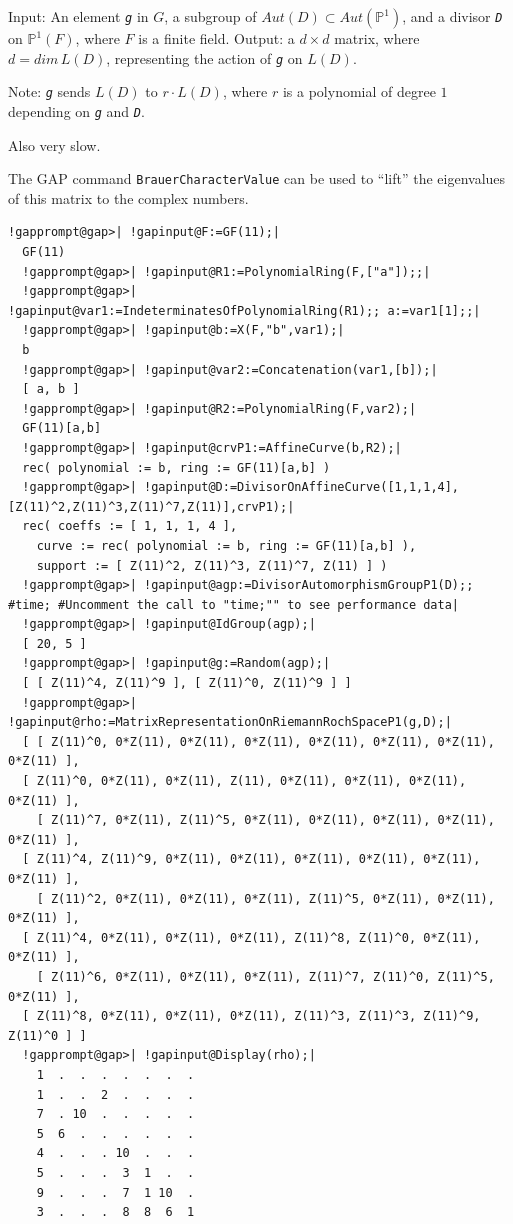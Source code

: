 \documentclass[a4paper,11pt]{report}
\begin{document}
{{{ Input: An element \mbox{\texttt{\mdseries\slshape g}} in $G$, a subgroup of $Aut(D)\subset Aut(\mathbb{P}^1)$, and a divisor \mbox{\texttt{\mdseries\slshape D}} on $\mathbb{P}^1(F)$, where $F$ is a finite field. Output: a $d\times d$ matrix, where $d = dim\, L(D)$, representing the action of \mbox{\texttt{\mdseries\slshape g}} on $L(D)$. 

 Note: \mbox{\texttt{\mdseries\slshape g}} sends $L(D)$ to $r\cdot L(D)$, where $r$ is a polynomial of degree $1$ depending on \mbox{\texttt{\mdseries\slshape g}} and \mbox{\texttt{\mdseries\slshape D}}. 

 Also very slow. 

 The GAP command \texttt{BrauerCharacterValue} can be used to ``lift'' the eigenvalues of this matrix to the complex numbers. 

 
\begin{Verbatim}[commandchars=!@|,fontsize=\small,frame=single,label=Example]
  !gapprompt@gap>| !gapinput@F:=GF(11);|
  GF(11)
  !gapprompt@gap>| !gapinput@R1:=PolynomialRing(F,["a"]);;|
  !gapprompt@gap>| !gapinput@var1:=IndeterminatesOfPolynomialRing(R1);; a:=var1[1];;|
  !gapprompt@gap>| !gapinput@b:=X(F,"b",var1);|
  b
  !gapprompt@gap>| !gapinput@var2:=Concatenation(var1,[b]);|
  [ a, b ]
  !gapprompt@gap>| !gapinput@R2:=PolynomialRing(F,var2);|
  GF(11)[a,b]
  !gapprompt@gap>| !gapinput@crvP1:=AffineCurve(b,R2);|
  rec( polynomial := b, ring := GF(11)[a,b] )
  !gapprompt@gap>| !gapinput@D:=DivisorOnAffineCurve([1,1,1,4],[Z(11)^2,Z(11)^3,Z(11)^7,Z(11)],crvP1);|
  rec( coeffs := [ 1, 1, 1, 4 ], 
    curve := rec( polynomial := b, ring := GF(11)[a,b] ), 
    support := [ Z(11)^2, Z(11)^3, Z(11)^7, Z(11) ] )
  !gapprompt@gap>| !gapinput@agp:=DivisorAutomorphismGroupP1(D);; #time; #Uncomment the call to "time;"" to see performance data|
  !gapprompt@gap>| !gapinput@IdGroup(agp);|
  [ 20, 5 ]
  !gapprompt@gap>| !gapinput@g:=Random(agp);|
  [ [ Z(11)^4, Z(11)^9 ], [ Z(11)^0, Z(11)^9 ] ]
  !gapprompt@gap>| !gapinput@rho:=MatrixRepresentationOnRiemannRochSpaceP1(g,D);|
  [ [ Z(11)^0, 0*Z(11), 0*Z(11), 0*Z(11), 0*Z(11), 0*Z(11), 0*Z(11), 0*Z(11) ], 
  [ Z(11)^0, 0*Z(11), 0*Z(11), Z(11), 0*Z(11), 0*Z(11), 0*Z(11), 0*Z(11) ],
    [ Z(11)^7, 0*Z(11), Z(11)^5, 0*Z(11), 0*Z(11), 0*Z(11), 0*Z(11), 0*Z(11) ], 
  [ Z(11)^4, Z(11)^9, 0*Z(11), 0*Z(11), 0*Z(11), 0*Z(11), 0*Z(11), 0*Z(11) ],
    [ Z(11)^2, 0*Z(11), 0*Z(11), 0*Z(11), Z(11)^5, 0*Z(11), 0*Z(11), 0*Z(11) ], 
  [ Z(11)^4, 0*Z(11), 0*Z(11), 0*Z(11), Z(11)^8, Z(11)^0, 0*Z(11), 0*Z(11) ],
    [ Z(11)^6, 0*Z(11), 0*Z(11), 0*Z(11), Z(11)^7, Z(11)^0, Z(11)^5, 0*Z(11) ], 
  [ Z(11)^8, 0*Z(11), 0*Z(11), 0*Z(11), Z(11)^3, Z(11)^3, Z(11)^9, Z(11)^0 ] ]
  !gapprompt@gap>| !gapinput@Display(rho);|
    1  .  .  .  .  .  .  .
    1  .  .  2  .  .  .  .
    7  . 10  .  .  .  .  .
    5  6  .  .  .  .  .  .
    4  .  .  . 10  .  .  .
    5  .  .  .  3  1  .  .
    9  .  .  .  7  1 10  .
    3  .  .  .  8  8  6  1
  

\end{Verbatim}}}}
\end{document}
